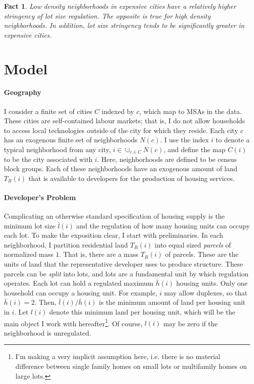 \documentclass[]{article}
\newtheorem{theorem}{Fact}
\begin{document}
\begin{theorem}\label{Fact3}
	Low density neighborhoods in expensive cities have a relatively higher stringency of lot size regulation. The opposite is true for high density neighborhoods. In addition, lot size stringency tends to be significantly greater in expensive cities. 
\end{theorem}


\section{Model}\label{section:Model}
\paragraph*{Geography}
I consider a finite set of cities $C$ indexed by $c$, which map to MSAs in the data. These cities are self-contained labour markets; that is, I do not allow households to access local technologies outside of the city for which they reside. Each city $c$ has an exogenous finite set of neighborhoods $N(c)$. I use the index $i$ to denote a typical neighborhood from any city, $i \in \cup_{c \in C}N(c)$, and define the map $C(i)$ to be the city associated with $i$. Here, neighborhoods are defined to be census block groups. Each of these neighborhoods have an exogenous amount of land $T_{R}(i)$ that is available to developers for the production of housing services.

\paragraph*{Developer's Problem}   
Complicating an otherwise standard specification of housing supply is the minimum lot size $\bar{l}(i)$ and the regulation of how many housing units can occupy each lot. To make the exposition clear, I start with preliminaries. In each neighborhood, I partition residential land $T_{R}(i)$ into equal sized \textit{parcels} of normalized mass $1$. That is, there are a mass $T_{R}(i)$ of parcels. These are the units of land that the representative developer uses to produce structure. These parcels can be \textit{split} into lots, and lots are a fundamental unit by which regulation operates. Each lot can hold a regulated maximum $\bar{h}(i)$ housing units. Only one household can occupy a housing unit. For example, $i$ may allow duplexes, so that $\bar{h}(i) = 2$. Then, $\bar{l}(i)/\bar{h}(i)$ is the minimum amount of land per housing unit in $i$. Let $l(i)$ denote this minimum land per housing unit, which will be the main object I work with hereafter\footnote{I'm making a very implicit assumption here, i.e. there is no material difference between single family homes on small lots or multifamily homes on large lots.}. Of course, $l(i)$ may be zero if the neighborhood is unregulated. 
\end{document}
